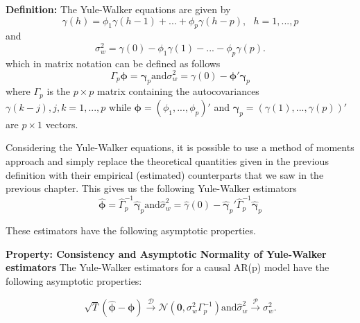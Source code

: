 \documentclass[]{book}
\theoremstyle{definition}
\theoremstyle{definition}
\theoremstyle{definition}
\theoremstyle{remark}
\begin{document}
{\textbf{Definition:} The Yule-Walker equations are given by
\begin{equation}
    \gamma(h) = \phi_1 \gamma(h-1) + ... + \phi_p \gamma(h-p), \mbox{ } h = 1,...,p
\end{equation} and \begin{equation}
    \sigma_w^2 = \gamma(0) - \phi_1 \gamma(1) - ... - \phi_p \gamma(p).
\end{equation} which in matrix notation can be defined as follows
\begin{equation}
    \Gamma_p \mathbf{\phi} = \mathbf{\gamma}_p \text{and} \sigma_w^2 = \gamma(0) - \mathbf{\phi}'\mathbf{\gamma}_p
\end{equation} where \(\Gamma_p\) is the \(p\times p\) matrix containing
the autocovariances \(\gamma(k-j), j,k = 1, ...,p\) while
\(\mathbf{\phi} = (\phi_1,...,\phi_p)'\) and
\(\mathbf{\gamma}_p = (\gamma(1),...,\gamma(p))'\) are \(p\times 1\)
vectors.

Considering the Yule-Walker equations, it is possible to use a method of
moments approach and simply replace the theoretical quantities given in
the previous definition with their empirical (estimated) counterparts
that we saw in the previous chapter. This gives us the following
Yule-Walker estimators \begin{equation}
    \hat{\mathbf{\phi}} = \hat{\Gamma}_p^{-1}\hat{\mathbf{\gamma}}_p \text{and} \hat{\sigma}_w^2 = \hat{\gamma}(0) - \hat{\mathbf{\gamma}}_p'\hat{\Gamma}_p^{-1}\hat{\mathbf{\gamma}}_p
\end{equation}

These estimators have the following asymptotic properties.

\textbf{Property: Consistency and Asymptotic Normality of Yule-Walker
estimators} The Yule-Walker estimators for a causal AR(p) model have the
following asymptotic properties:

\begin{equation*}
\sqrt{T}(\hat{\mathbf{\phi}}- \mathbf{\phi}) \xrightarrow{\mathcal{D}} \mathcal{N}(\mathbf{0},\sigma_w^2\Gamma_p^{-1}) \text{and} \hat{\sigma}_w^2 \xrightarrow{\mathcal{P}} \sigma_w^2 .
\end{equation*}

}
\end{document}
